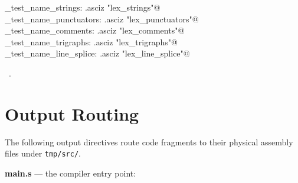 \documentclass[11pt,a4paper,twoside,openright,DIV=15]{scrbook}
\theoremstyle{definition}
\theoremstyle{plain}
\theoremstyle{remark}
\begin{document}
\begin{flushleft}
\begin{minipage}{\linewidth}
\begin{list}{}{}
\mbox{}\verb@_test_name_strings:      .asciz "lex_strings"@\\
\mbox{}\verb@_test_name_punctuators:  .asciz "lex_punctuators"@\\
\mbox{}\verb@_test_name_comments:     .asciz "lex_comments"@\\
\mbox{}\verb@_test_name_trigraphs:    .asciz "lex_trigraphs"@\\
\mbox{}\verb@_test_name_line_splice:  .asciz "lex_line_splice"@\\
\mbox{}\verb@@{\NWsep}
\end{list}
\vspace{-1.5ex}
\footnotesize
\begin{list}{}{\setlength{\itemsep}{-\parsep}\setlength{\itemindent}{-\leftmargin}}
\item \NWtxtMacroRefIn\ .

\item{}
\end{list}
\end{minipage}\vspace{4ex}
\end{flushleft}
%
%

\chapter*{Output Routing}

The following output directives route code fragments to their
physical assembly files under \texttt{tmp/src/}.

\bigskip

\noindent\textbf{main.s} --- the compiler entry point:
\end{document}
